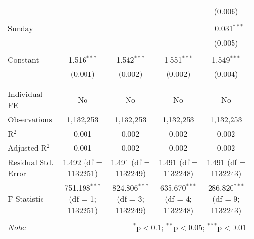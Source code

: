 \documentclass[
]{article}
\begin{document}
\begin{table}[!htbp]
{\begin{tabular}{@{\extracolsep{5pt}}lcccc}
  &  &  &  & (0.006) \\ 
  & & & & \\ 
 Sunday &  &  &  & $-$0.031$^{***}$ \\ 
  &  &  &  & (0.005) \\ 
  & & & & \\ 
 Constant & 1.516$^{***}$ & 1.542$^{***}$ & 1.551$^{***}$ & 1.549$^{***}$ \\ 
  & (0.001) & (0.002) & (0.002) & (0.004) \\ 
  & & & & \\ 
\hline \\[-1.8ex] 
Individual FE & No & No & No & No \\ 
Observations & 1,132,253 & 1,132,253 & 1,132,253 & 1,132,253 \\ 
R$^{2}$ & 0.001 & 0.002 & 0.002 & 0.002 \\ 
Adjusted R$^{2}$ & 0.001 & 0.002 & 0.002 & 0.002 \\ 
Residual Std. Error & 1.492 (df = 1132251) & 1.491 (df = 1132249) & 1.491 (df = 1132248) & 1.491 (df = 1132243) \\ 
F Statistic & 751.198$^{***}$ (df = 1; 1132251) & 824.806$^{***}$ (df = 3; 1132249) & 635.670$^{***}$ (df = 4; 1132248) & 286.820$^{***}$ (df = 9; 1132243) \\ 
\hline 
\hline \\[-1.8ex] 
\textit{Note:}  & \multicolumn{4}{r}{$^{*}$p$<$0.1; $^{**}$p$<$0.05; $^{***}$p$<$0.01} \\ 
\end{tabular}
} 
\end{table} 
\newpage
\end{document}
